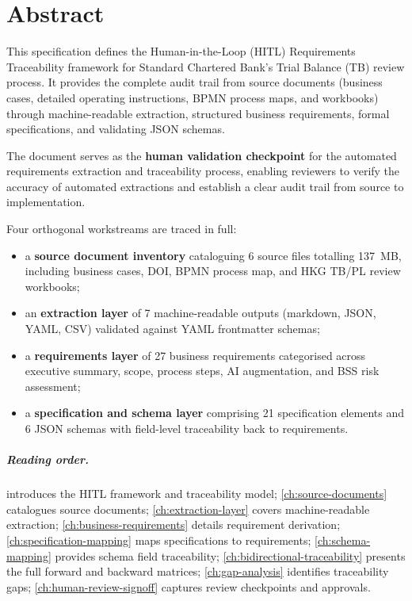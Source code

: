 \chapter*{Abstract}

This specification defines the Human-in-the-Loop (HITL) Requirements
Traceability framework for Standard Chartered Bank's Trial Balance (TB)
review process. It provides the complete audit trail from source documents
(business cases, detailed operating instructions, BPMN process maps, and
workbooks) through machine-readable extraction, structured business
requirements, formal specifications, and validating JSON schemas.

The document serves as the \textbf{human validation checkpoint} for the
automated requirements extraction and traceability process, enabling
reviewers to verify the accuracy of automated extractions and establish
a clear audit trail from source to implementation.

Four orthogonal workstreams are traced in full:

\begin{itemize}
  \item a \textbf{source document inventory} cataloguing 6 source files
        totalling 137~MB, including business cases, DOI, BPMN process map,
        and HKG TB/PL review workbooks;
  \item an \textbf{extraction layer} of 7 machine-readable outputs
        (markdown, JSON, YAML, CSV) validated against YAML frontmatter
        schemas;
  \item a \textbf{requirements layer} of 27 business requirements
        categorised across executive summary, scope, process steps,
        AI augmentation, and BSS risk assessment;
  \item a \textbf{specification and schema layer} comprising 21
        specification elements and 6 JSON schemas with field-level
        traceability back to requirements.
\end{itemize}

\paragraph{Reading order.}  introduces the HITL framework
and traceability model; \cref{ch:source-documents} catalogues source
documents; \cref{ch:extraction-layer} covers machine-readable extraction;
\cref{ch:business-requirements} details requirement derivation;
\cref{ch:specification-mapping} maps specifications to requirements;
\cref{ch:schema-mapping} provides schema field traceability;
\cref{ch:bidirectional-traceability} presents the full forward and
backward matrices; \cref{ch:gap-analysis} identifies traceability gaps;
\cref{ch:human-review-signoff} captures review checkpoints and approvals.

